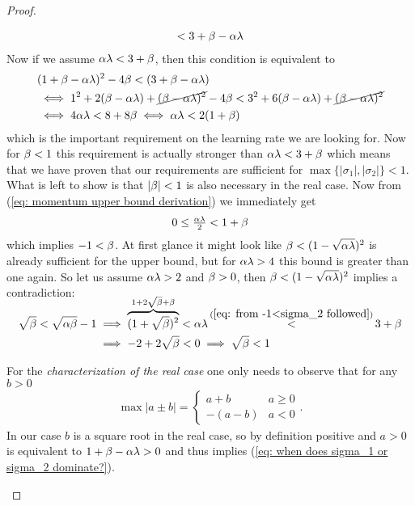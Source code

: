 \begin{proof}
\begin{description}[wide, labelindent=0pt]
\begin{align}
			< 3+\beta-\alpha\lambda
		\end{align}
		Now if we assume \(\alpha\lambda < 3+\beta\), then this condition is
		equivalent to 
		\begin{align}
			\nonumber
			&(1+\beta-\alpha\lambda)^2 - 4\beta < (3+\beta-\alpha\lambda)\\
			\nonumber
			&\iff 1^2 + 2(\beta-\alpha\lambda) + \cancel{(\beta-\alpha\lambda)^2} - 4\beta
			< 3^2 + 6(\beta-\alpha\lambda) + \cancel{(\beta-\alpha\lambda)^2}\\
			\label{eq: momentum upper bound derivation}
			&\iff 4\alpha\lambda < 8 + 8\beta
			\iff \alpha\lambda < 2(1+\beta)
		\end{align}
		which is the important requirement on the learning rate we are looking for.
		Now for \(\beta<1\) this requirement is actually stronger than
		\(\alpha\lambda <3+\beta\) which means that we have proven that our
		requirements are sufficient for \(\max\{|\sigma_1|,|\sigma_2|\}<1\).
		What is left to show is that \(|\beta|<1\) is also necessary in the real
		case. Now from (\ref{eq: momentum upper bound derivation}) we immediately
		get
		\begin{align*}
			0 \le \tfrac{\alpha\lambda}2 < 1+\beta
		\end{align*}
		which implies \(-1 < \beta\). At first glance it might look like
		\(\beta<(1-\sqrt{\alpha\lambda})^2\) is already sufficient for the upper
		bound, but for \(\alpha\lambda>4\) this bound is greater than one again.
		So let us assume \(\alpha\lambda>2\) and \(\beta>0\), then
		\(\beta<(1-\sqrt{\alpha\lambda})^2\) implies a contradiction:
		\begin{align*}
			\sqrt{\momCoeff} < \sqrt{\lrSq\momCoeff} -1
			&\implies \smash{\overbrace{(1+\sqrt{\momCoeff})^2}^{1+2\sqrt{\momCoeff} + \momCoeff}}
			< \lrSq\hesseEV
			\stackrel{(\ref{eq: from -1<sigma_2 followed})}{<} 3+\momCoeff \\
			&\implies -2 +2\sqrt{\momCoeff} < 0
			\implies \sqrt{\momCoeff} < 1
		\end{align*}

		For the \emph{characterization of the real case} one only needs to observe
		that for any \(b>0\)
		\begin{align}
			\max|a\pm b| = \begin{cases}
				a + b & a \ge 0\\
				-(a-b) & a < 0
			\end{cases}.
		\end{align}
		In our case \(b\) is a square root in the real case, so by definition
		positive and \(a>0\) is equivalent to \(1+\beta - \alpha\lambda >0\)
		and thus implies (\ref{eq: when does sigma_1 or sigma_2 dominate?}).
		

\end{description}
\end{proof}
